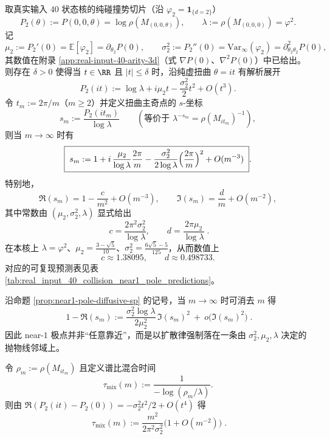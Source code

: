 \begin{proposition}\label{prop:near1-pole-diffusive-sp}
取真实输入 \(40\) 状态核的纯碰撞势切片（沿 \(\varphi_2=\mathbf{1}_{\{d=2\}}\)）
\[
P_2(\theta):=P(0,0,\theta)=\log\rho(M_{(0,0,\theta)}),
\qquad \lambda:=\rho(M_{(0,0,0)})=\varphi^2.
\]
记
\[
\mu_2:=P_2'(0)=\mathbb{E}[\varphi_2]=\partial_{\theta_2}P(0),
\qquad
\sigma_2^2:=P_2''(0)=\mathrm{Var}_\infty(\varphi_2)=\partial_{\theta_2\theta_2}^2P(0),
\]
其数值在附录 \ref{app:real-input-40-arity-3d}（式 \(\nabla P(0)\)、\(\nabla^2P(0)\)）中已给出。
则存在 \(\delta>0\) 使得当 \(t\in\RR\) 且 \(|t|\le \delta\) 时，沿纯虚扭曲 \(\theta=it\) 有解析展开
\[
P_2(it)
:=\log\lambda+i\mu_2 t-\frac{\sigma_2^2}{2}t^2+O(t^3).
\]
令 \(t_m:=2\pi/m\)（\(m\ge 2\)）并定义扭曲主奇点的 \(s\)-坐标
\[
s_m:=\frac{P_2(it_m)}{\log\lambda}
\qquad(\text{等价于 } \lambda^{-s_m}=\rho(M_{it_m})^{-1}),
\]
则当 \(m\to\infty\) 时有
\[
\boxed{\;
s_m
:=1+i\,\frac{\mu_2}{\log\lambda}\frac{2\pi}{m}
-\frac{\sigma_2^2}{2\log\lambda}\Bigl(\frac{2\pi}{m}\Bigr)^2
+O(m^{-3})\; }.
\]
特别地，
\[
\Re(s_m)=1-\frac{c}{m^2}+O(m^{-3}),
\qquad
\Im(s_m)=\frac{d}{m}+O(m^{-2}),
\]
其中常数由 \((\mu_2,\sigma_2^2,\lambda)\) 显式给出
\[
\boxed{\;
c=\frac{2\pi^2\sigma_2^2}{\log\lambda},
\qquad
d=\frac{2\pi\mu_2}{\log\lambda}\; }.
\]
在本核上 \(\lambda=\varphi^2\)、\(\mu_2=\frac{3-\sqrt5}{10}\)、\(\sigma_2^2=\frac{6\sqrt5-5}{125}\)，从而数值上
\[
c\approx 1.38095,
\qquad
d\approx 0.498733.
\]
对应的可复现预测表见表 \ref{tab:real_input_40_collision_near1_pole_predictions}。
\end{proposition}

\begin{corollary}\label{cor:near1-pole-parabola}
沿命题 \ref{prop:near1-pole-diffusive-sp} 的记号，当 \(m\to\infty\) 时可消去 \(m\) 得
\[
\boxed{\;
1-\Re(s_m)
:=\frac{\sigma_2^2\log\lambda}{2\mu_2^2}\,\Im(s_m)^2\ +\ o\!\bigl(\Im(s_m)^2\bigr)\; }.
\]
因此 near-\(1\) 极点并非“任意靠近”，而是以扩散律强制落在一条由
\(\sigma_2^2,\mu_2,\lambda\) 决定的抛物线邻域上。
\end{corollary}

\begin{corollary}\label{cor:near1-pole-taumix-m2}
令 \(\rho_m:=\rho(M_{it_m})\) 且定义谱比混合时间
\[
\tau_{\mathrm{mix}}(m):=\frac{1}{-\log(\rho_m/\lambda)}.
\]
则由 \(\Re(P_2(it)-P_2(0))=-\sigma_2^2 t^2/2+O(t^4)\) 得
\[
\boxed{\;
\tau_{\mathrm{mix}}(m)
:=\frac{m^2}{2\pi^2\sigma_2^2}\bigl(1+O(m^{-2})\bigr)\; }.
\]
\end{corollary}

